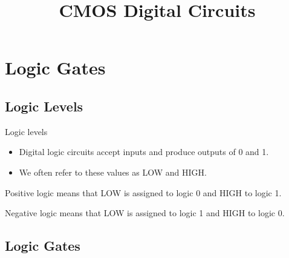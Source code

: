 \title{CMOS Digital Circuits}


\section{Logic Gates}

\subsection{Logic Levels}

\begin{frame}{Logic levels}
  \begin{itemize}
    \item Digital logic circuits accept inputs and produce outputs of 0 and 1.
    \item We often refer to these values as LOW and HIGH.
  \end{itemize}
  \begin{definition}
    \alert{Positive logic} means that LOW is assigned to logic 0 and HIGH to logic 1.
  \end{definition}
  \begin{definition}
    \alert{Negative logic} means that LOW is assigned to logic 1 and HIGH to logic 0.
  \end{definition}
\end{frame}

\subsection{Logic Gates}

